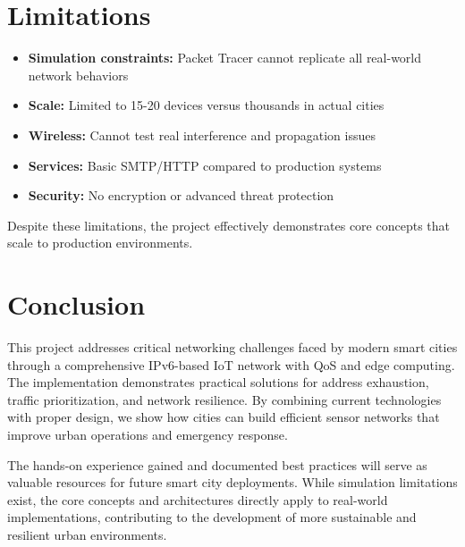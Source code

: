 \documentclass[12pt,a4paper]{article}
\begin{document}
\section*{Limitations}
{}
\begin{itemize}[nosep]
    \item \textbf{Simulation constraints:} Packet Tracer cannot replicate all real-world network behaviors
    \item \textbf{Scale:} Limited to 15-20 devices versus thousands in actual cities
    \item \textbf{Wireless:} Cannot test real interference and propagation issues
    \item \textbf{Services:} Basic SMTP/HTTP compared to production systems
    \item \textbf{Security:} No encryption or advanced threat protection
\end{itemize}

Despite these limitations, the project effectively demonstrates core concepts that scale to production environments.

\section*{Conclusion}
{}
This project addresses critical networking challenges faced by modern smart cities through a comprehensive IPv6-based IoT network with QoS and edge computing. The implementation demonstrates practical solutions for address exhaustion, traffic prioritization, and network resilience. By combining current technologies with proper design, we show how cities can build efficient sensor networks that improve urban operations and emergency response.

The hands-on experience gained and documented best practices will serve as valuable resources for future smart city deployments. While simulation limitations exist, the core concepts and architectures directly apply to real-world implementations, contributing to the development of more sustainable and resilient urban environments.
\end{document}
